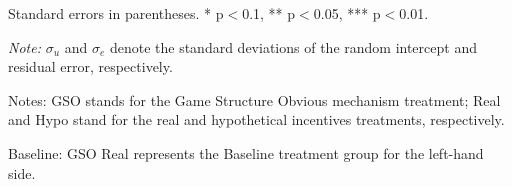 \documentclass[12pt]{article}
\begin{document}
\begin{table}[H]
\begin{tablenotes}
            \footnotesize
            \item Standard errors in parentheses. * p$<$0.1, ** p$<$0.05, *** p$<$0.01.
            \item \textit{Note:} $\sigma_u$ and $\sigma_e$ denote the standard deviations of the random intercept and residual error, respectively.
            \item Notes: GSO stands for the Game Structure Obvious mechanism treatment; Real and Hypo stand for the real and hypothetical incentives treatments, respectively.
           \item Baseline: GSO Real represents the Baseline treatment group for the left-hand side.
        \end{tablenotes}
\end{table}

\clearpage
\end{document}
